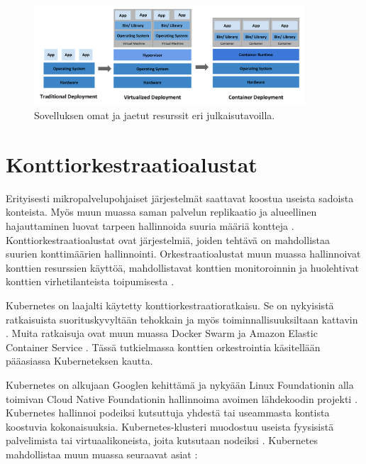 \begin{figure}[ht]
\begin{center}
\includegraphics[width=0.9\textwidth]{figures/container_evolution.png}
\caption{Sovelluksen omat ja jaetut resurssit eri julkaisutavoilla.\cite{Kubernetes23}\label{fig:container}}
\end{center}
\end{figure}

\section{Konttiorkestraatioalustat\label{platforms}}

Erityisesti mikropalvelupohjaiset järjestelmät saattavat koostua useista sadoista konteista.
Myös muun muassa saman palvelun replikaatio ja alueellinen hajauttaminen luovat tarpeen hallinnoida suuria määriä kontteja \cite{Khan17}.
Konttiorkestraatioalustat ovat järjestelmiä, joiden tehtävä on mahdollistaa suurien konttimäärien hallinnointi.
Orkestraatioalustat muun muassa hallinnoivat konttien resurssien käyttöä, mahdollistavat konttien monitoroinnin ja huolehtivat konttien virhetilanteista toipumisesta \cite{Zhou21}.

Kubernetes on laajalti käytetty konttiorkestraatioratkaisu.
Se on nykyisistä ratkaisuista suorituskyvyltään tehokkain ja myös toiminnallisuuksiltaan kattavin \cite{Jawarneh19}.
Muita ratkaisuja ovat muun muassa Docker Swarm ja Amazon Elastic Container Service \cite{Khan17}.
Tässä tutkielmassa konttien orkestrointia käsitellään pääasiassa Kuberneteksen kautta.

Kubernetes on alkujaan Googlen kehittämä ja nykyään Linux Foundationin alla toimivan Cloud Native Foundationin hallinnoima avoimen lähdekoodin projekti \cite{Burns22}.
Kubernetes hallinnoi podeiksi kutsuttuja yhdestä tai useammasta kontista koostuvia kokonaisuuksia.
Kubernetes-klusteri muodostuu useista fyysisistä palvelimista tai virtuaalikoneista, joita kutsutaan nodeiksi \cite{Medel18}.
Kubernetes mahdollistaa muun muassa seuraavat asiat \cite{Zhou21}:

